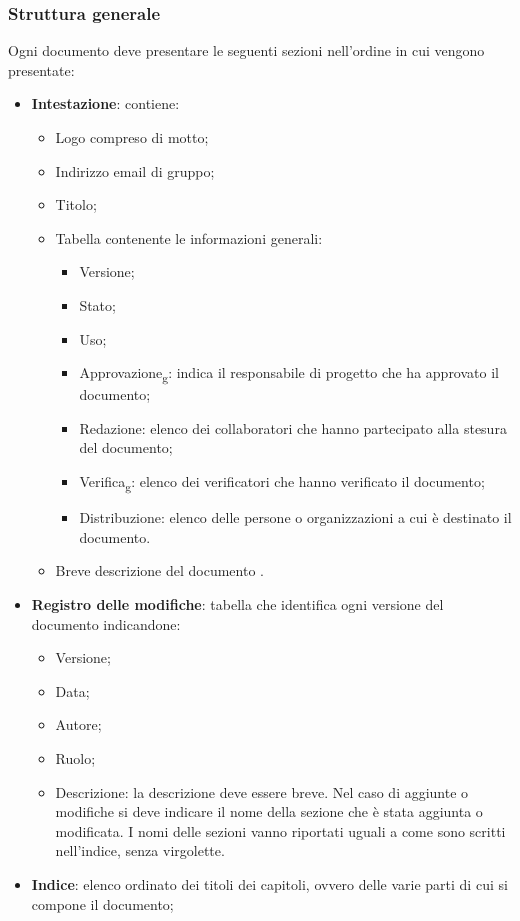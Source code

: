 \subsubsection{Struttura generale}
Ogni documento deve presentare le seguenti sezioni nell'ordine in cui vengono presentate:
\begin{itemize} 
    \item \textbf{Intestazione}:
    contiene:
    \begin{itemize} 
        \item Logo compreso di motto;
        \item Indirizzo email di gruppo; 
        \item Titolo;
        \item Tabella contenente le informazioni generali:
        \begin{itemize}
            \item Versione;
            \item Stato;
            \item Uso;
            \item Approvazione\textsubscript{g}: indica il responsabile di progetto che ha approvato il documento; 
            \item Redazione: elenco dei collaboratori che hanno partecipato alla stesura del documento;
            \item Verifica\textsubscript{g}: elenco dei verificatori che hanno verificato il documento;
            \item Distribuzione: elenco delle persone o organizzazioni a cui è destinato il documento.
        \end{itemize}
        \item Breve descrizione del documento .
    \end{itemize}
    \item \textbf{Registro delle modifiche}:
    tabella che identifica ogni versione del documento indicandone:
    \begin{itemize} 
        \item Versione;
        \item Data;
        \item Autore;
        \item Ruolo;
        \item Descrizione: la descrizione deve essere breve. Nel caso di aggiunte o modifiche si deve indicare 
        il nome della sezione che è stata aggiunta o modificata. 
        I nomi delle sezioni vanno riportati uguali a come sono scritti nell'indice, 
        senza virgolette.
    \end{itemize}
    \item \textbf{Indice}:
    elenco ordinato dei titoli dei capitoli, ovvero delle varie parti di cui si compone il documento;
    

\end{itemize}
